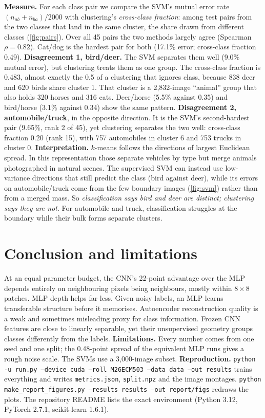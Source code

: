 \documentclass[10pt,twocolumn,letterpaper]{article}
\begin{document}
\textbf{Measure.} For each class pair we compare the SVM's mutual error rate $(n_{ab}{+}n_{ba})/2000$ with clustering's \emph{cross-class fraction}: among test pairs from the two classes that land in the same cluster, the share drawn from different classes (\cref{fig:pairs}).
Over all 45 pairs the two methods largely agree (Spearman $\rho{=}0.82$).
Cat/dog is the hardest pair for both (17.1\% error; cross-class fraction 0.49).
\textbf{Disagreement 1, bird/deer.} The SVM separates them well (9.0\% mutual error), but clustering treats them as one group.
The cross-class fraction is 0.483, almost exactly the 0.5 of a clustering that ignores class, because 838 deer and 620 birds share cluster 1.
That cluster is a 2,832-image ``animal'' group that also holds 320 horses and 316 cats.
Deer/horse (5.5\% against 0.35) and bird/horse (3.1\% against 0.34) show the same pattern.
\textbf{Disagreement 2, automobile/truck}, in the opposite direction.
It is the SVM's second-hardest pair (9.65\%, rank 2 of 45), yet clustering separates the two well: cross-class fraction 0.20 (rank 15), with 757 automobiles in cluster 6 and 753 trucks in cluster 0.
\textbf{Interpretation.} $k$-means follows the directions of largest Euclidean spread.
In this representation those separate vehicles by type but merge animals photographed in natural scenes.
The supervised SVM can instead use low-variance directions that still predict the class (bird against deer), while its errors on automobile/truck come from the few boundary images (\cref{fig:svm}) rather than from a merged mass.
So \emph{classification says bird and deer are distinct; clustering says they are not}.
For automobile and truck, classification struggles at the boundary while their bulk forms separate clusters.

\section{Conclusion and limitations}
At an equal parameter budget, the CNN's 22-point advantage over the MLP depends entirely on neighbouring pixels being neighbours, mostly within $8{\times}8$ patches.
MLP depth helps far less.
Given noisy labels, an MLP learns transferable structure before it memorises.
Autoencoder reconstruction quality is a weak and sometimes misleading proxy for class information.
Frozen CNN features are close to linearly separable, yet their unsupervised geometry groups classes differently from the labels.
\textbf{Limitations.} Every number comes from one seed and one split; the 0.48-point spread of the equivalent MLP runs gives a rough noise scale.
The SVMs use a 3,000-image subset.
\textbf{Reproduction.}
\texttt{python -u run.py --device cuda --roll M26ECM503 --data data --out results}
trains everything and writes \texttt{metrics.json}, \texttt{split.npz} and the image montages.
\texttt{python make\_report\_figures.py --results results --out report/figs} redraws the plots.
The repository README lists the exact environment (Python 3.12, PyTorch 2.7.1, scikit-learn 1.6.1).

{\small


}
\end{document}
